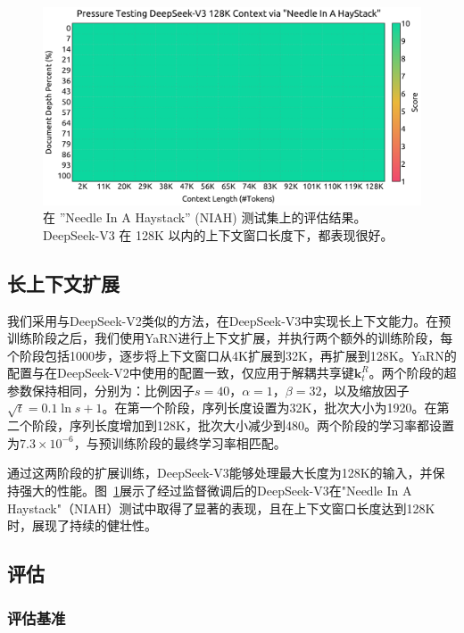 \documentclass[lang=cn,a4paper,newtx]{elegantpaper}
\newcommand{\dsvii}{DeepSeek-V2}
\newcommand{\dsviii}{DeepSeek-V3}
\begin{document}
\begin{figure}[h]
    \centering
    \includegraphics[width=0.98\linewidth]{figures/needle_in_a_haystack.pdf}
    \caption{
        在 ''Needle In A Haystack'' (NIAH) 测试集上的评估结果。\dsviii{} 在 128K 以内的上下文窗口长度下，都表现很好。
    }
    \label{fig:long_context}
\end{figure}

\subsection{长上下文扩展}

我们采用与\dsvii{}类似的方法，在\dsviii{}中实现长上下文能力。在预训练阶段之后，我们使用YaRN进行上下文扩展，并执行两个额外的训练阶段，每个阶段包括1000步，逐步将上下文窗口从4K扩展到32K，再扩展到128K。YaRN的配置与在\dsvii{}中使用的配置一致，仅应用于解耦共享键$\mathbf{k}^R_t$。两个阶段的超参数保持相同，分别为：比例因子$s = 40$，$\alpha = 1$，$\beta = 32$，以及缩放因子$\sqrt{t} = 0.1 \ln{s} + 1$。在第一个阶段，序列长度设置为32K，批次大小为1920。在第二个阶段，序列长度增加到128K，批次大小减少到480。两个阶段的学习率都设置为$7.3 \times 10^{-6}$，与预训练阶段的最终学习率相匹配。  

通过这两阶段的扩展训练，\dsviii{}能够处理最大长度为128K的输入，并保持强大的性能。图~\ref{fig:long_context}展示了经过监督微调后的\dsviii{}在"Needle In A Haystack"（NIAH）测试中取得了显著的表现，且在上下文窗口长度达到128K时，展现了持续的健壮性。

\subsection{评估}

\subsubsection{评估基准}
\end{document}
